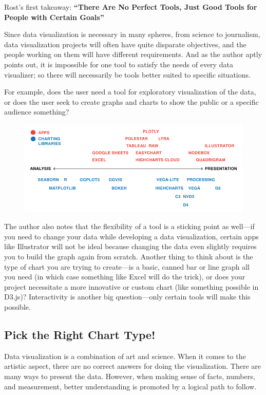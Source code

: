 \documentclass[]{book}
\theoremstyle{definition}
\theoremstyle{definition}
\theoremstyle{definition}
\theoremstyle{remark}
\begin{document}
Rost's first takeaway: \textbf{``There Are No Perfect Tools, Just Good
Tools for People with Certain Goals''}

Since data visualization is necessary in many spheres, from science to
journalism, data visualization projects will often have quite disparate
objectives, and the people working on them will have different
requirements. And as the author aptly points out, it is impossible for
one tool to satisfy the needs of every data visualizer; so there will
necessarily be tools better suited to specific situations.

For example, does the user need a tool for exploratory visualization of
the data, or does the user seek to create graphs and charts to show the
public or a specific audience something?

\begin{figure}
\centering
\includegraphics{images/analysis_spectrum.png}
\caption{}
\end{figure}

The author also notes that the flexibility of a tool is a sticking point
as well---if you need to change your data while developing a data
visualization, certain apps like Illustrator will not be ideal because
changing the data even slightly requires you to build the graph again
from scratch. Another thing to think about is the type of chart you are
trying to create---is a basic, canned bar or line graph all you need (in
which case something like Excel will do the trick), or does your project
necessitate a more innovative or custom chart (like something possible
in D3.js)? Interactivity is another big question---only certain tools
will make this possible.

\subsection{Pick the Right Chart Type!}\label{pick-the-right-chart-type}

Data visualization is a combination of art and science. When it comes to
the artistic aspect, there are no correct answers for doing the
visualization. There are many ways to present the data. However, when
making sense of facts, numbers, and measurement, better understanding is
promoted by a logical path to follow.
\end{document}
